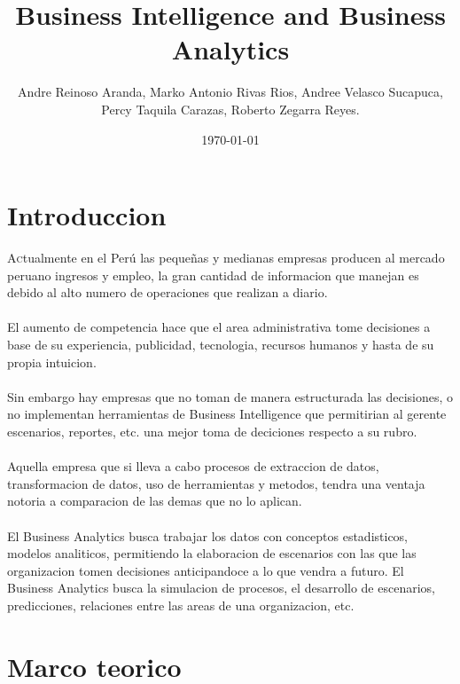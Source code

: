 \documentclass[twoside,twocolumn]{article}
\title{Business Intelligence and Business Analytics}
\author{Andre Reinoso Aranda, Marko Antonio Rivas Rios, Andree Velasco Sucapuca, \\
Percy Taquila Carazas, Roberto Zegarra Reyes. }
\date{\today}
\begin{document}
\maketitle


\section{Introduccion}
\lettrine[nindent=0em,lines=3]{A}ctualmente en el Perú las pequeñas y medianas empresas producen al mercado peruano ingresos y empleo, la gran cantidad de informacion que manejan es debido al alto numero de operaciones que realizan a diario.\\ \\
El aumento de competencia hace que el area administrativa tome decisiones a base de su experiencia, publicidad, tecnologia, recursos humanos y hasta de su propia intuicion.\\ \\
Sin embargo hay empresas que no toman de manera estructurada las decisiones, o no implementan herramientas de Business Intelligence que permitirian al gerente escenarios, reportes, etc. una mejor toma de deciciones respecto a su rubro. \\ \\
Aquella empresa que si lleva a cabo procesos de extraccion de datos, transformacion de datos, uso de herramientas y metodos, tendra una ventaja notoria a comparacion de las demas que no lo aplican.
\\ \\
El Business Analytics busca trabajar los datos con conceptos estadisticos, modelos analiticos, permitiendo la elaboracion de escenarios con las que las organizacion tomen decisiones anticipandoce a lo que vendra a futuro. El Business Analytics busca la simulacion de procesos, el desarrollo de escenarios, predicciones, relaciones entre las areas de una organizacion, etc.




\section{Marco teorico}
\end{document}
